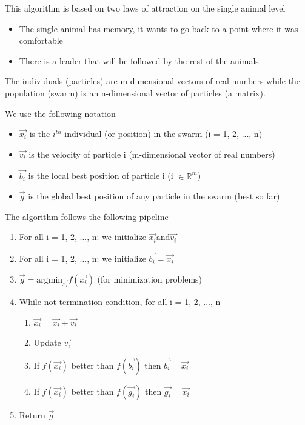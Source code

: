 \vspace{10pt}

This algorithm is based on two laws of attraction on the single animal level

\begin{itemize}
    \item The single animal has memory, it wants to go back to a point where it was comfortable
    \item There is a leader that will be followed by the rest of the animals
\end{itemize}

The individuals (particles) are m-dimensional vectors of real numbers while the population (swarm) is an n-dimensional vector of particles (a matrix).

We use the following notation

\begin{itemize}
    \item $\vec{x_i}$ is the $i^{th}$ individual (or position) in the swarm (i = 1, 2, ..., n)
    \item $\vec{v_i}$ is the velocity of particle i (m-dimensional vector of real numbers)
    \item $\vec{b_i}$ is the local best position of particle i (i $\in \mathbb{R}^m$)
    \item $\vec{g}$ is the global best position of any particle in the swarm (best so far)
\end{itemize}
The algorithm follows the following pipeline

\begin{enumerate}
    \item For all i = 1, 2, ..., n: we initialize $\vec{x_i} \text{and} \vec{v_i}$
    \item For all i = 1, 2, ..., n: we initialize $\vec{b_i} = \vec{x_i}$
    \item $\vec{g} = \text{argmin}_{\vec{x_i}} f(\vec{x_i})$ (for minimization problems)
    \item While not termination condition, for all i = 1, 2, ..., n
    \begin{enumerate}
        \item $\vec{x_i} = \vec{x_i} + \vec{v_i}$
        \item Update $\vec{v_i}$
        \item If $f(\vec{x_i})$ better than $f(\vec{b_i})$ then $ \vec{b_i} = \vec{x_i}$
        \item If $f(\vec{x_i})$ better than $f(\vec{g_i})$ then $ \vec{g_i} = \vec{x_i}$
    \end{enumerate}
    \item Return $\vec{g}$
\end{enumerate}


